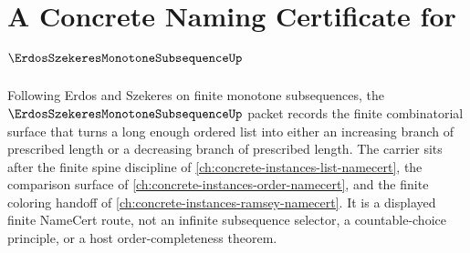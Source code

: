 \chapter{A Concrete Naming Certificate for $\ErdosSzekeresMonotoneSubsequenceUp$}
\label{ch:concrete-instances-erdos-szekeres-monotone-subsequence-namecert}

Following Erdos and Szekeres on finite monotone subsequences, the $\ErdosSzekeresMonotoneSubsequenceUp$ packet records the finite combinatorial surface that turns a long enough ordered list into either an increasing branch of prescribed length or a decreasing branch of prescribed length. The carrier sits after the finite spine discipline of \autoref{ch:concrete-instances-list-namecert}, the comparison surface of \autoref{ch:concrete-instances-order-namecert}, and the finite coloring handoff of \autoref{ch:concrete-instances-ramsey-namecert}. It is a displayed finite NameCert route, not an infinite subsequence selector, a countable-choice principle, or a host order-completeness theorem.

